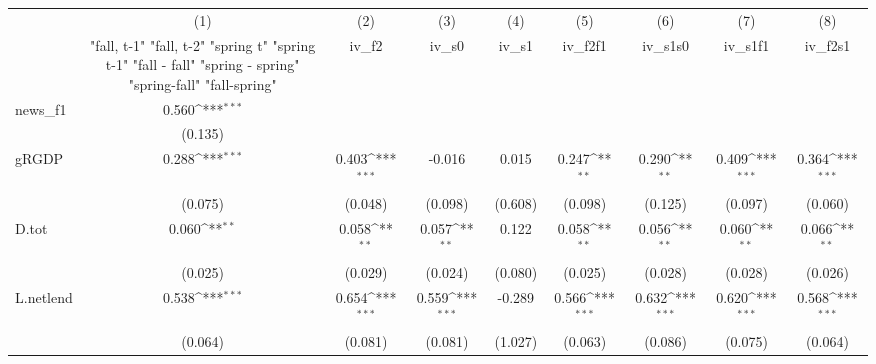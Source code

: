 {
\def\sym#1{\ifmmode^{#1}\else\(^{#1}\)\fi}
\begin{tabular}{l*{8}{c}}
\toprule
            &\multicolumn{1}{c}{(1)}&\multicolumn{1}{c}{(2)}&\multicolumn{1}{c}{(3)}&\multicolumn{1}{c}{(4)}&\multicolumn{1}{c}{(5)}&\multicolumn{1}{c}{(6)}&\multicolumn{1}{c}{(7)}&\multicolumn{1}{c}{(8)}\\
            &\multicolumn{1}{c}{  "fall, t-1" "fall, t-2" "spring t" "spring t-1"  "fall - fall" "spring - spring" "spring-fall" "fall-spring" }&\multicolumn{1}{c}{iv\_f2}&\multicolumn{1}{c}{iv\_s0}&\multicolumn{1}{c}{iv\_s1}&\multicolumn{1}{c}{iv\_f2f1}&\multicolumn{1}{c}{iv\_s1s0}&\multicolumn{1}{c}{iv\_s1f1}&\multicolumn{1}{c}{iv\_f2s1}\\
\midrule
news\_f1     &       0.560\sym{***}&                     &                     &                     &                     &                     &                     &                     \\
            &     (0.135)         &                     &                     &                     &                     &                     &                     &                     \\
\addlinespace
gRGDP       &       0.288\sym{***}&       0.403\sym{***}&      -0.016         &       0.015         &       0.247\sym{**} &       0.290\sym{**} &       0.409\sym{***}&       0.364\sym{***}\\
            &     (0.075)         &     (0.048)         &     (0.098)         &     (0.608)         &     (0.098)         &     (0.125)         &     (0.097)         &     (0.060)         \\
\addlinespace
D.tot       &       0.060\sym{**} &       0.058\sym{**} &       0.057\sym{**} &       0.122         &       0.058\sym{**} &       0.056\sym{**} &       0.060\sym{**} &       0.066\sym{**} \\
            &     (0.025)         &     (0.029)         &     (0.024)         &     (0.080)         &     (0.025)         &     (0.028)         &     (0.028)         &     (0.026)         \\
\addlinespace
L.netlend   &       0.538\sym{***}&       0.654\sym{***}&       0.559\sym{***}&      -0.289         &       0.566\sym{***}&       0.632\sym{***}&       0.620\sym{***}&       0.568\sym{***}\\
            &     (0.064)         &     (0.081)         &     (0.081)         &     (1.027)         &     (0.063)         &     (0.086)         &     (0.075)         &     (0.064)         \\

\end{tabular}}
